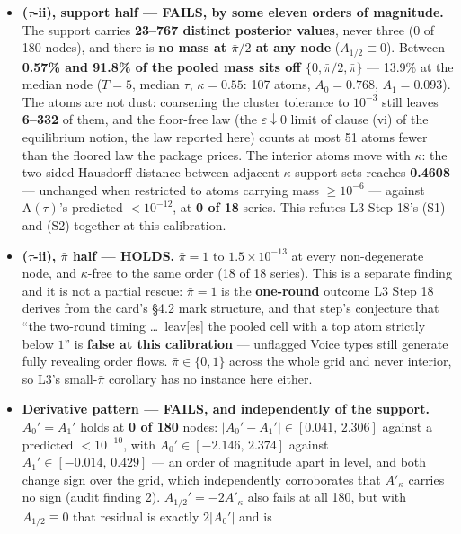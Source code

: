 \documentclass[11pt,a4paper]{article}
\newcommand{\Atau}{\mathrm{A}(\tau)}
\newcommand{\Akap}{A'_{\kappa}}
\begin{document}
\begin{description}[leftmargin=1.9em,style=unboxed]
  \begin{itemize}
  \item \textbf{($\tau$-ii), support half --- FAILS, by some eleven orders of magnitude.}
    The support carries \textbf{23--767 distinct posterior values}, never three (0 of 180
    nodes), and there is \textbf{no mass at $\bar\pi/2$ at any node}
    ($A_{1/2}\equiv0$). Between \textbf{0.57\% and 91.8\% of the pooled mass sits off
    $\{0,\bar\pi/2,\bar\pi\}$} --- 13.9\% at the median node ($T=5$, median $\tau$,
    $\kappa=0.55$: 107 atoms, $A_0=0.768$, $A_1=0.093$). The atoms are not dust:
    coarsening the cluster tolerance to $10^{-3}$ still leaves \textbf{6--332} of them,
    and the floor-free law (the $\varepsilon\downarrow0$ limit of clause (vi) of the
    equilibrium notion, the law reported here) counts at most 51 atoms fewer than the
    floored law the package prices. The interior atoms move with $\kappa$: the two-sided
    Hausdorff distance between adjacent-$\kappa$ support sets reaches \textbf{0.4608} ---
    unchanged when restricted to atoms carrying mass $\ge10^{-6}$ --- against $\Atau$'s
    predicted $<10^{-12}$, at \textbf{0 of 18} series. This refutes L3 Step 18's (S1) and
    (S2) together at this calibration.
  \item \textbf{($\tau$-ii), $\bar\pi$ half --- HOLDS.} $\bar\pi=1$ to
    $1.5\times10^{-13}$ at every non-degenerate node, and $\kappa$-free to the same order
    (18 of 18 series). This is a separate finding and it is not a partial rescue:
    $\bar\pi=1$ is the \textbf{one-round} outcome L3 Step 18 derives from the card's
    \S4.2 mark structure, and that step's conjecture that ``the two-round timing \dots\ leav[es]
    the pooled cell with a top atom strictly below $1$'' is \textbf{false at this
    calibration} --- unflagged Voice types still generate fully revealing order flows.
    $\bar\pi\in\{0,1\}$ across the whole grid and never interior, so L3's small-$\bar\pi$
    corollary has no instance here either.
  \item \textbf{Derivative pattern --- FAILS, and independently of the support.}
    $A_0'=A_1'$ holds at \textbf{0 of 180} nodes:
    $\lvert A_0'-A_1'\rvert\in[0.041,\,2.306]$ against a predicted $<10^{-10}$, with
    $A_0'\in[-2.146,\,2.374]$ against $A_1'\in[-0.014,\,0.429]$ --- an order of magnitude
    apart in level, and both change sign over the grid, which independently corroborates
    that $\Akap$ carries no sign (audit finding 2). $A_{1/2}'=-2\Akap$ also fails at all
    180, but with $A_{1/2}\equiv0$ that residual is exactly $2\lvert A_0'\rvert$ and is

\end{itemize}
\end{description}
\end{document}
